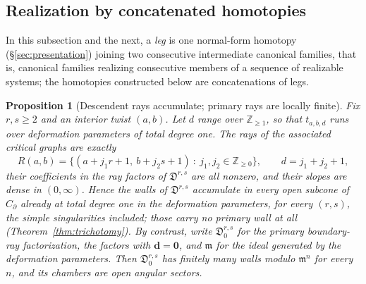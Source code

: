 \documentclass[11pt]{amsart}
\newtheorem{proposition}[theorem]{Proposition}
\theoremstyle{definition}
\theoremstyle{remark}
\newcommand{\ZZ}{\mathbb{Z}}
\newcommand{\Dscr}{\mathfrak{D}}
\begin{document}
\subsection{Realization by concatenated homotopies}
\label{ssec:realization}

In this subsection and the next, a \emph{leg} is one normal-form homotopy
(\S\ref{sec:presentation}) joining two consecutive intermediate canonical
families, that is, canonical families realizing consecutive members of a
sequence of realizable systems; the homotopies constructed below are
concatenations of legs.

\begin{proposition}[Descendent rays accumulate; primary rays are locally finite]
\label{prop:localfinite}
Fix $r,s\ge2$ and an interior twist $(a,b)$. Let $d$ range over $\ZZ_{\ge1}$, so that $t_{a,b,d}$ runs over deformation
parameters of total degree one. The rays of the associated critical graphs are
exactly
\[
R(a,b)=\bigl\{(a+j_1r+1,\ b+j_2s+1)\ :\ j_1,j_2\in\ZZ_{\ge0}\bigr\},
\qquad d=j_1+j_2+1,
\]
their coefficients in the ray factors of $\Dscr^{r,s}$ are all nonzero, and
their slopes are dense
in $(0,\infty)$. Hence the walls of $\Dscr^{r,s}$
accumulate in every open subcone of $C_\partial$ already at total degree one
in the deformation parameters, for every $(r,s)$, the simple singularities
included; those carry no primary wall at all (Theorem~\ref{thm:trichotomy}). By contrast, write
$\Dscr^{r,s}_{0}$ for the \emph{primary boundary-ray factorization}, the factors with
$\mathbf d=\mathbf 0$, and $\mathfrak m$ for the ideal generated by the
deformation parameters. Then $\Dscr^{r,s}_{0}$ has finitely many walls modulo
$\mathfrak m^{n}$ for every $n$, and its chambers are open angular sectors.
\end{proposition}
\end{document}
